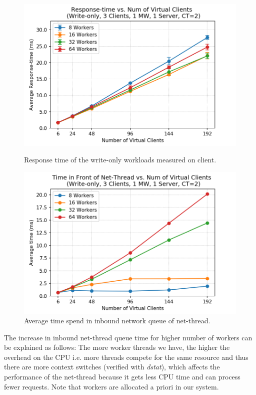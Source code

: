 \begin{figure}[H]
    \begin{minipage}{0.48\textwidth}
        \centering
	    \includegraphics[scale=0.48]{figures/2_BaselineWithMW/one_mw/one_mw_mem_rt_write_2018-12-06_23h08.png}
	    \caption{Response time of the write-only workloads measured on client.}
	    \label{rt_mem_write_one_mw}
   \end{minipage}\hfill
   \begin{minipage}{0.48\textwidth}
        \centering
	    \includegraphics[scale=0.48]{figures/2_BaselineWithMW/one_mw/one_mw_rt_write_front_netthread_2018-12-06_23h08.png}
	    \caption{Average time spend in inbound network queue of net-thread.}
	    \label{netthread_queue_write}
   \end{minipage}
\end{figure}
The increase in inbound net-thread queue time for higher number of workers can be explained as follows: The more worker threads we have, the higher the overhead on the CPU i.e. more threads compete for the same resource and thus there are more context switches (verified with \textit{dstat}), which affects the performance of the net-thread because it gets less CPU time and can process fewer requests. Note that workers are allocated a priori in our system.

